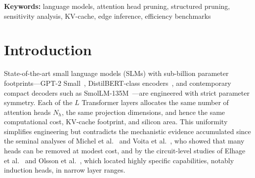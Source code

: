 \documentclass[11pt]{article}
\begin{document}
\begin{abstract}
sensitivity ranking dominates at equal sparsity: Taylor (55.6953) outperforms the
L2 weight-norm heuristic (641.1694) and the five-seed random control
(270.7793$\pm$155.3170). Physically excised checkpoints reduce decode latency by
up to 18.2\% ($B{=}1$) on CPU and the Theorem-3 KV-cache footprint by exactly 33.3\%
($B{=}8$, $T{=}1024$, fp16), while two CUDA replications measure wall-clock
decode parity with the same exact memory reduction.
A complete seven-model matrix on an RTX PRO 6000 Blackwell GPU (fp16, 30\%
excision; GPT-2 Small/Medium, OPT-125M~\cite{zhang2022opt},
Pythia-160M/410M~\cite{biderman2023pythia}, SmolLM-135M,
Qwen2.5-0.5B~\cite{qwen2025qwen25}) widens the unrepaid envelope to 13--92\%,
measures a two-epoch repayment recovering 15--57\% of the damage (over
100\% at 10\% excision), and shows GQA KV sharing capping Qwen2.5-0.5B's
cache cut at 16.7\% measured versus 29.2\% theoretical.
The study contributes an exact, repayment-free, audit-traceable methodology and
demonstrates that measured sensitivity geometry---not structural symmetry---should
govern non-uniform head allocation for on-device SLM deployment.
\end{abstract}

\vspace{2pt}\noindent\textbf{Keywords:} language models, attention head pruning, structured pruning, sensitivity analysis,
KV-cache, edge inference, efficiency benchmarks

\section{Introduction}
State-of-the-art small language models (SLMs) with sub-billion
parameter footprints---GPT-2 Small~\cite{radford2019language}, DistilBERT-class
encoders~\cite{sanh2019distilbert}, and contemporary compact decoders such as
SmolLM-135M~\cite{allal2025smollm}---are engineered with strict parameter symmetry.
Each of the $L$ Transformer layers allocates the same number of attention heads
$N_h$, the same projection dimensions, and hence the same computational cost,
KV-cache footprint, and silicon area. This uniformity simplifies engineering but
contradicts the mechanistic evidence accumulated since the seminal analyses of
Michel et al.~\cite{michel2019sixteen} and Voita et al.~\cite{voita2019analyzing}, who
showed that many heads can be removed at modest cost, and by the circuit-level
studies of Elhage et al.~\cite{elhage2021mathematical} and
Olsson et al.~\cite{olsson2022context}, which located highly specific capabilities,
notably induction heads, in narrow layer ranges.
\end{document}
